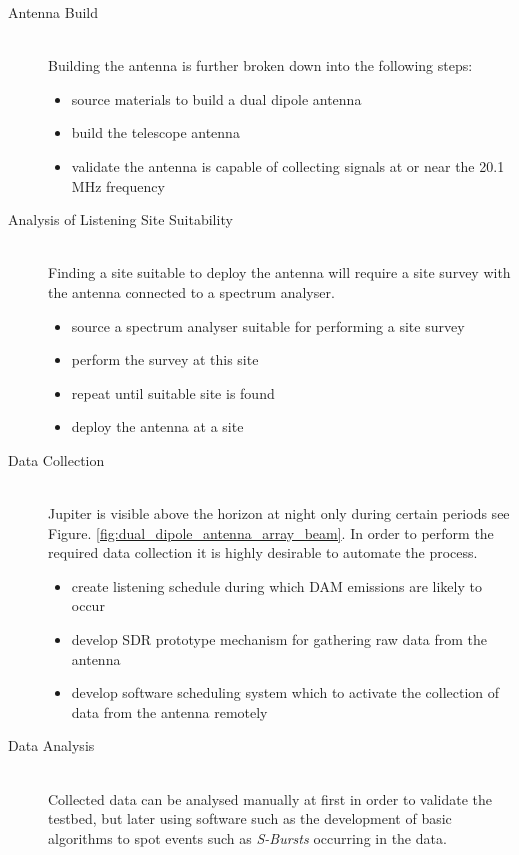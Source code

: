 \documentclass[runningheads,a4paper]{llncs}
\begin{document}
\begin{description}
  \item[Antenna Build] \hfill \\
    Building the antenna is further broken down into the following steps:
    \begin{itemize}
      \item source materials to build a dual dipole antenna
      \item build the telescope antenna
      \item validate the antenna is capable of collecting signals at or near the 20.1 MHz frequency \\
    \end{itemize}
  \item [Analysis of Listening Site Suitability] \hfill \\
    Finding a site suitable to deploy the antenna will require a site survey with the antenna connected to a spectrum analyser.
    \begin{itemize}
      \item source a spectrum analyser suitable for performing a site survey
      \item perform the survey at this site
      \item repeat until suitable site is found 
      \item deploy the antenna at a site \\
    \end{itemize}
  \item [Data Collection] \hfill \\
    Jupiter is visible above the horizon at night only during certain periods see Figure. \ref{fig:dual_dipole_antenna_array_beam}. In order to perform the required data collection it is highly desirable to automate the process.
    \begin{itemize}
      \item create listening schedule during which \gls{DAM} emissions are likely to occur
      \item develop \gls{SDR} prototype mechanism for gathering raw data from the antenna
      \item develop software scheduling system which to activate the collection of data from the antenna remotely\\
    \end{itemize}
  \item [Data Analysis] \hfill \\
    Collected data can be analysed manually at first in order to validate the testbed, but later using software such as the development of basic algorithms to spot events such as \textit{S-Bursts} occurring in the data.

\end{description}
\end{document}
